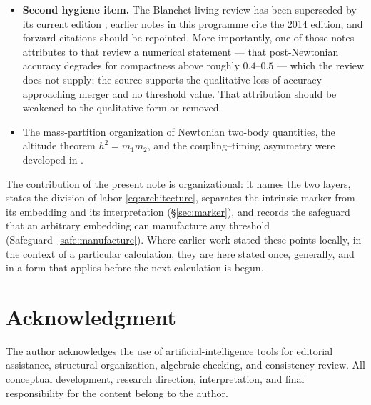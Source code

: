 \documentclass[11pt,a4paper]{article}
\theoremstyle{definition}
\theoremstyle{plain}
\theoremstyle{remark}
\begin{document}
\begin{itemize}[leftmargin=*]
\item \textbf{Second hygiene item.} The Blanchet living review has been
superseded by its current edition \cite{Blanchet2024}; earlier notes in this
programme cite the 2014 edition, and forward citations should be repointed. More
importantly, one of those notes attributes to that review a numerical statement
--- that post-Newtonian accuracy degrades for compactness above roughly
$0.4$--$0.5$ --- which the review does not supply; the source supports the
qualitative loss of accuracy approaching merger and no threshold value. That
attribution should be weakened to the qualitative form or
removed.

\item The mass-partition organization of Newtonian two-body quantities, the
altitude theorem $h^{2}=m_{1}m_{2}$, and the coupling--timing asymmetry were
developed in \cite{Newtonian2Body}.
\end{itemize}

The contribution of the present note is organizational: it names the two layers,
states the division of labor \eqref{eq:architecture}, separates the intrinsic
marker from its embedding and its interpretation (\S\ref{sec:marker}), and
records the safeguard that an arbitrary embedding can manufacture any threshold
(Safeguard~\ref{safe:manufacture}). Where earlier work stated these points
locally, in the context of a particular calculation, they are here stated once,
generally, and in a form that applies before the next calculation is begun.

\section*{Acknowledgment}
The author acknowledges the use of artificial-intelligence tools for editorial
assistance, structural organization, algebraic checking, and consistency
review. All conceptual development, research direction, interpretation, and
final responsibility for the content belong to the author.
\end{document}
